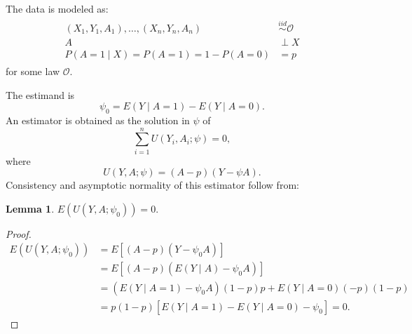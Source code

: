 \message{ !name(manuscript.tex)}\documentclass[10pt,a4paper]{amsart}
\newtheorem{lemma}[theorem]{Lemma}
\newcommand{\EE}{E}
\newcommand{\PP}{P}
\begin{document}

The data is modeled as:
\begin{gather}
\begin{aligned}
  \label{eqn:model}
  (X_1,Y_1,A_1),\ldots,(X_n,Y_n,A_n) &\overset{iid}{\sim}\mathcal{O}\\
  A&\perp X\\
  \PP(A=1\mid X) = \PP(A=1) = 1-\PP(A=0)&= p
\end{aligned}
\end{gather}
for some law $\mathcal{O}$.
\begin{figure}[h!]
  \centering
{}
\end{figure}

The estimand is
$$
\psi_0 = \EE(Y\mid A=1) - \EE(Y\mid A=0).
$$
An estimator is obtained as the solution in $\psi$ of
\[
\sum_{i=1}^nU(Y_i,A_i;\psi) = 0,
\]
where
\[
  U(Y,A;\psi) = (A-p)(Y-\psi A).
\]
Consistency and asymptotic normality of this estimator follow from:
\begin{lemma}\label{lemma:1}
  $\EE(U(Y,A;\psi_0))=0.$
\end{lemma}
\begin{proof}
  \begin{align*}
    \EE(U(Y,A;\psi_0)) &= \EE[(A-p)(Y-\psi_0 A)]\\
                       &= \EE[(A-p)(\EE(Y\mid A) - \psi_0A)]\\
                       &= (\EE(Y\mid A=1)-\psi_0A)(1-p)p + \EE(Y\mid A=0)(-p)(1-p)\\
                       &= p(1-p)[\EE(Y\mid A=1) - \EE(Y\mid A=0) - \psi_0]=0.
  \end{align*}
\end{proof}
\end{document}
